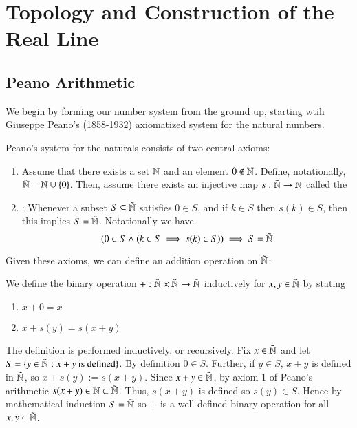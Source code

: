 \chapter{Topology and Construction of the Real Line}\label{RealLineCons}


\section{Peano Arithmetic}

We begin by forming our number system from the ground up, starting wtih Giuseppe Peano's (1858-1932) axiomatized system for the natural numbers.

\begin{axiom}
    Peano's system for the naturals consists of two central axioms: \begin{enumerate}
        \item Assume that there exists a set $\mathbb N$ and an element $0 \notin \mathbb N$. Define, notationally, $\tilde{\mathbb N} = \mathbb N\cup\{0\}$. Then, assume there exists an injective map $s:\tilde{\mathbb N}\rightarrow \mathbb N$ called the 
        \item {}: Whenever a subset $S \subseteq \tilde{\mathbb N}$ satisfies $0 \in S$, and if $k \in S$ then $s(k) \in S$, then this implies $S = \tilde{\mathbb N}$. Notationally we have $$(0 \in S \land (k \in S \implies s(k) \in S)) \implies S = \tilde{\mathbb N}$$
    \end{enumerate}
\end{axiom}

Given these axioms, we can define an addition operation on $\tilde{\mathbb N}$:
\begin{definition}
    We define the binary operation $+:\tilde{\mathbb N}\times\tilde{\mathbb N}\rightarrow\tilde{\mathbb N}$ inductively for $x,y \in \tilde{\mathbb N}$ by stating \begin{enumerate}
        \item $x + 0 = x$ 
        \item $x + s(y) = s(x+y)$ 
    \end{enumerate}
\end{definition}

The definition is performed inductively, or recursively. Fix $x \in \tilde{\mathbb N}$ and let $S = \{y \in \tilde{\mathbb N}:x+y\text{ is defined}\}$. By definition $0 \in S$. Further, if $y \in S$, $x+y$ is defined in $\tilde{\mathbb N}$, so $x+s(y) := s(x+y)$. Since $x+y \in \tilde{\mathbb N}$, by axiom 1 of Peano's arithmetic $s(x+y) \in \mathbb N\subset \tilde{\mathbb N}$. Thus, $s(x+y)$ is defined so $s(y) \in S$. Hence by mathematical induction $S = \tilde{\mathbb N}$ so $+$ is a well defined binary operation for all $x,y \in \tilde{\mathbb N}$.

